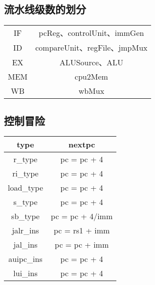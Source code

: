 \documentclass{article}
\begin{document}
        \subsection{流水线级数的划分}
        \begin{center}
            \begin{tabular}{|c|c|}
            \hline
                IF & pcReg、controlUnit、immGen \\
                ID & compareUnit、regFile、jmpMux \\
                EX & ALUSource、ALU \\
                MEM & cpu2Mem \\
                WB & wbMux \\
            \hline
            \end{tabular}
        \end{center}

        \subsection{控制冒险}

        \begin{center}
            \begin{tabular}{|c|c|}
            \hline
                type & nextpc \\
            \hline
                r\_type & pc = pc + 4 \\
                ri\_type & pc = pc + 4 \\
                load\_type & pc = pc + 4 \\
                s\_type & pc = pc + 4 \\
                sb\_type & pc = pc + 4/imm \\
                jalr\_ins & pc = rs1 + imm \\
                jal\_ins & pc = pc + imm \\
                auipc\_ins & pc = pc + 4 \\
                lui\_ins & pc = pc + 4 \\
            \hline
            \end{tabular}
        \end{center}
        
\end{document}
